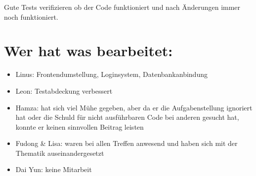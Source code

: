 \documentclass[a4paper, 12pt, oneside, BCOR1cm,toc=chapterentrywithdots]{scrbook}
\begin{document}
Gute Tests verifizieren ob der Code funktioniert und nach Änderungen immer noch funktioniert.

\section*{Wer hat was bearbeitet:}
\begin{itemize}
\item Linus: Frontendumstellung, Loginsystem, Datenbankanbindung
\item Leon: Testabdeckung verbessert
\item Hamza: hat sich viel Mühe gegeben, aber da er die Aufgabenstellung ignoriert hat oder die Schuld für nicht ausführbaren Code bei anderen gesucht hat, konnte er keinen sinnvollen Beitrag leisten
\item Fudong \& Lisa: waren bei allen Treffen anwesend und haben sich mit der Thematik auseinandergesetzt
\item Dai Yun: keine Mitarbeit
\end{itemize}
\end{document}
